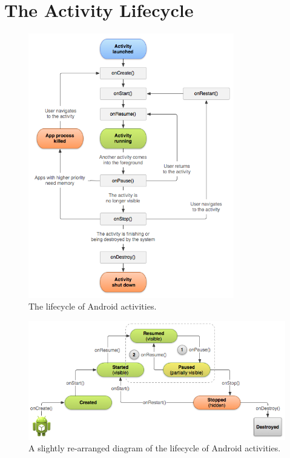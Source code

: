 \documentclass[12pt, a4paper, twoside]{book}
\begin{document}
\section{The Activity Lifecycle}


\begin{figure}[htb]
\centering
\includegraphics[width=0.8\textwidth]{images/android_lifecycle_original}
\caption{The lifecycle of Android activities.}
\label{fig:lifecycle-android-activities}
\end{figure}


\begin{figure}[htb]
\centering
\includegraphics[width=\textwidth]{images/android_lifecycle_state-diagram}
\caption{A slightly re-arranged diagram of the lifecycle of Android activities.}
\label{fig:lifecycle-android-activities-state-diargram}
\end{figure}
\end{document}
